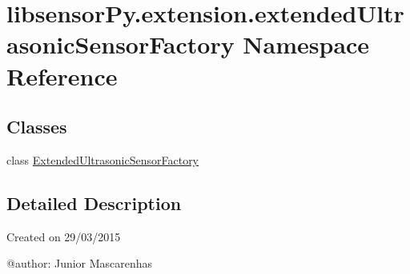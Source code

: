 \hypertarget{namespacelibsensorPy_1_1extension_1_1extendedUltrasonicSensorFactory}{}\section{libsensor\+Py.\+extension.\+extended\+Ultrasonic\+Sensor\+Factory Namespace Reference}
\label{namespacelibsensorPy_1_1extension_1_1extendedUltrasonicSensorFactory}
\subsection*{Classes}
\begin{DoxyCompactItemize}
\item 
class \hyperlink{classlibsensorPy_1_1extension_1_1extendedUltrasonicSensorFactory_1_1ExtendedUltrasonicSensorFactory}{Extended\+Ultrasonic\+Sensor\+Factory}
\end{DoxyCompactItemize}


\subsection{Detailed Description}
\begin{DoxyVerb}Created on 29/03/2015

@author: Junior Mascarenhas
\end{DoxyVerb}
 